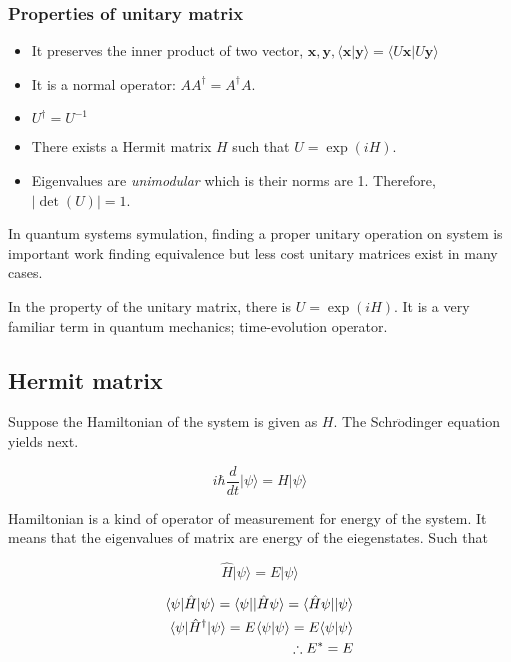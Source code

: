 \documentclass[10pt]{article}
\begin{document}
\subsubsection{Properties of unitary matrix}

\begin{itemize}
    \item It preserves the inner product of two vector, $\mathbf{x,y}, \langle \mathbf{x |y }\rangle = \langle U \mathbf{x}| U \mathbf{y}\rangle$
    \item It is a normal operator: $A A^\dagger = A^\dagger A$.
    \item $U^\dagger = U^{-1}$
    \item There exists a Hermit matrix $H$ such that $U = \exp(i H)$.
    \item Eigenvalues are \textit{unimodular} which is their norms are 1. Therefore, $|\det(U)| =1$.
\end{itemize}

In quantum systems symulation, finding a proper unitary operation on system is important work finding equivalence but less cost unitary matrices exist in many cases.

In the property of the unitary matrix, there is $U = \exp(i H)$. 
It is a very familiar term in quantum mechanics; time-evolution operator. 

\subsection{Hermit matrix}

Suppose the Hamiltonian of the system is given as $H$. The Schr$\ddot{\mbox{o}}$dinger  equation yields next.

\begin{equation}
    i \hbar \frac{d}{d t} | \psi \rangle = H | \psi \rangle
\end{equation}

Hamiltonian is a kind of operator of measurement for energy of the system. It means that the eigenvalues of matrix are energy of the eiegenstates.
Such that 

\begin{equation}
    \hat{H} | \psi \rangle = E | \psi \rangle
\end{equation}


\begin{eqnarray}
    \langle \psi | \hat{H} | \psi \rangle = \langle \psi | |\hat{H}\psi \rangle = \langle \hat{H} \psi | | \psi \rangle \\
    \langle \psi |\hat{H}^\dagger | \psi \rangle = E^{\*} \langle \psi | \psi \rangle = E \langle \psi | \psi \rangle \\
    \therefore E^{\ast} = E
\end{eqnarray}
\end{document}
